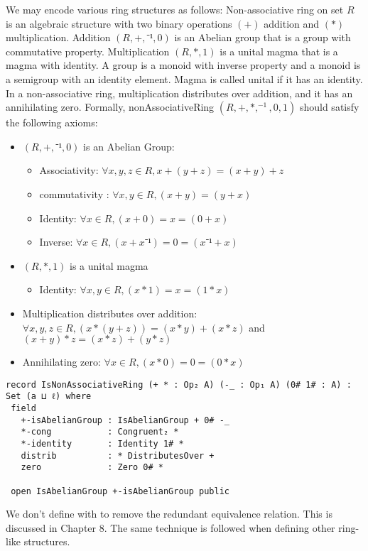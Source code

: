 We may encode various ring structures as follows: Non-associative
ring on set $R$ is an algebraic structure with two binary operations $(+)$
addition and $(*)$ multiplication. Addition $(R,+,⁻¹,0)$ is an Abelian group
that is a group with commutative property. Multiplication $(R,*,1)$ is a unital
magma that is a magma with identity. A group is a monoid with inverse property
and a monoid is a semigroup with an identity element. Magma is called unital
if it has an identity. In a non-associative ring, multiplication distributes over
addition, and it has an annihilating zero. Formally, nonAssociativeRing
$(R,+,*,^{-1},0,1)$ should satisfy the following axioms:
\begin{itemize}
  \item $(R,+,⁻¹,0)$ is an Abelian Group:
   \begin{itemize}
    \item Associativity: $\forall x,y,z \in R, x + (y + z) = (x + y) + z$
    \item commutativity : $\forall x,y \in R, (x + y) = (y + x)$
    \item Identity: $\forall x \in R, (x + 0) = x = (0 + x)$
    \item Inverse: $\forall x \in R, (x + x⁻¹) = 0 = (x⁻¹ + x)$
  \end{itemize}
  \item $(R,*,1)$ is a unital magma
  \begin{itemize}
    \item Identity: $\forall x,y \in R, (x * 1) = x = (1 * x)$
  \end{itemize}
  \item Multiplication distributes over addition: \(\forall x , y , z \in R, (x * (y + z)) = (x * y) + (x
  * z)\) and \( (x + y) * z = (x * z) + (y * z) \)
  \item Annihilating zero: \(\forall x \in R, (x * 0) = 0 = (0 * x)\)
\end{itemize}

\begin{verbatim}
record IsNonAssociativeRing (+ * : Op₂ A) (-_ : Op₁ A) (0# 1# : A) : Set (a ⊔ ℓ) where
 field
   +-isAbelianGroup : IsAbelianGroup + 0# -_
   *-cong           : Congruent₂ *
   *-identity       : Identity 1# *
   distrib          : * DistributesOver +
   zero             : Zero 0# *

 open IsAbelianGroup +-isAbelianGroup public
\end{verbatim}

We don't define  with  to
remove the redundant equivalence relation. This is discussed in Chapter 8. The
same technique is followed when defining other ring-like structures.

